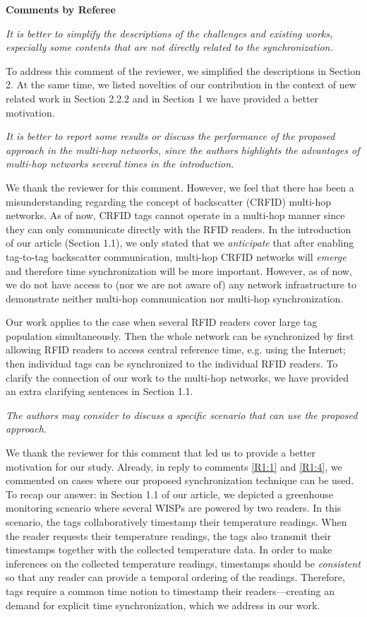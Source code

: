 \documentclass[10pt]{article}
\newcommand{\referee}[1]{
	{\item \color{OliveGreen} \emph{{#1}}}
	\label{R\therefereeCounter:\arabic{enumi}}
}
\newcommand{\response}[1]{{\color{blue} #1}}
\newcounter{refereeCounter}
\newenvironment{responses}{%
\refstepcounter{refereeCounter}%
\textbf{\large Comments by Referee \therefereeCounter}
\begin{enumerate}%
\renewcommand{\labelenumi}{\textbf{[R\therefereeCounter :\,\arabic{enumi}]}} %
}{\end{enumerate}}
\begin{document}
\begin{responses}

\referee{It is better to simplify the descriptions of the challenges and existing works, especially some contents that are not directly related to the synchronization.}
	
\response{To address this comment of the reviewer, we simplified the descriptions in Section 2. At the same time, we listed novelties of our contribution in the context of new related work in Section 2.2.2  and in Section 1 we have provided a better motivation.}

\referee{It is better to report some results or discuss the performance of the proposed approach in the multi-hop networks, since the authors highlights the advantages of multi-hop networks several times in the introduction.}
	
\response{We thank the reviewer for this comment. However, we feel that there has been a misunderstanding regarding the concept of backscatter (CRFID) multi-hop networks. As of now, CRFID tags cannot operate in a multi-hop manner since they can only communicate directly with the RFID readers. In the introduction of our article (Section 1.1), we only stated that we \emph{anticipate} that after enabling tag-to-tag backscatter communication, multi-hop CRFID networks will \emph{emerge} and therefore time synchronization will be more important. However, as of now, we do not have access to (nor we are not aware of) any network infrastructure to demonstrate neither multi-hop communication nor multi-hop synchronization. 

Our work applies to the case when several RFID readers cover large tag population simultaneously. Then the whole network can be synchronized by first allowing RFID readers to access central reference time, e.g. using the Internet; then individual tags can be synchronized to the individual RFID readers. To clarify the connection of our work to the multi-hop networks, we have provided an extra clarifying sentences in Section 1.1.}
	
\referee{The authors may consider to discuss a specific scenario that can use the proposed approach.}
	
\response{We thank the reviewer for this comment that led us to provide a better motivation for our study. Already, in reply to comments \hyperref[R1:1]{[R1:1]} and \hyperref[R1:4]{[R1:4]}, we commented on cases where our proposed synchronization technique can be used. To recap our answer: in Section 1.1 of our article, we depicted a greenhouse monitoring scneario where several WISPs  are powered by two readers. In this scenario, the tags collaboratively timestamp their temperature readings. When the reader requests their temperature readings, the tags also transmit their timestamps together with the collected temperature data. In order to make inferences on the collected temperature readings, timestamps should be \emph{consistent} so that any reader can provide a temporal ordering of the readings. Therefore, tags require a common time notion to timestamp their readers---creating an demand for explicit time synchronization, which we address in our work.}

\end{responses}
\end{document}

